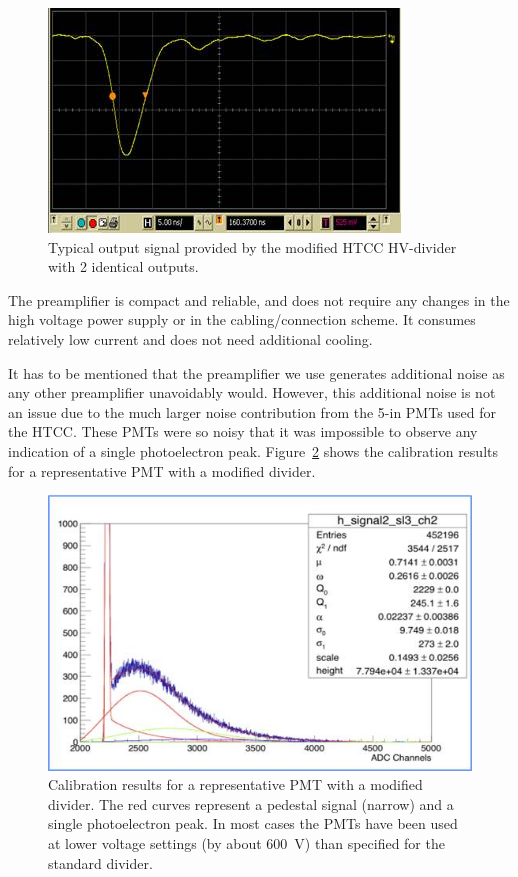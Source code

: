 \begin{figure}[!ht]
    \centering
    \includegraphics[width=1.0\linewidth,trim={0.0cm 0.0cm 0.0cm 0.0cm},clip]{images/POPOV_3.jpg}
    \caption{Typical output signal provided by the modified HTCC HV-divider with 2 identical outputs.}
    \label{fig:POPOV_3}
\end{figure}

The preamplifier is compact and reliable, and does not require any changes in the high voltage power supply or
in the cabling/connection scheme. It consumes relatively low current and does not need additional cooling.
 
It has to be mentioned that the preamplifier we use generates additional noise as any other preamplifier
unavoidably would. However, this additional noise is not an issue due to the much larger noise contribution from
the 5-in PMTs used for the HTCC. These PMTs were so noisy that it was impossible to observe any indication of a
single photoelectron peak. Figure~\ref{fig:POPOV_4} shows the calibration results for a representative PMT
with a modified divider.   

\begin{figure}[!ht]
    \centering
    \includegraphics[width=1.0\linewidth,trim={0.0cm 0.0cm 0.0cm 0.0cm},clip]{images/POPOV_4.jpg}
    \caption{Calibration results for a representative PMT with a modified divider. The red curves represent a pedestal
      signal (narrow) and a single photoelectron peak. In most cases the PMTs have been used at lower voltage settings
      (by about 600~V) than specified for the standard divider.}
    \label{fig:POPOV_4}
\end{figure}

